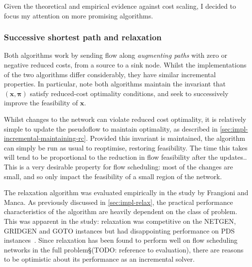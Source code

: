 Given the theoretical and empirical evidence against cost scaling, I decided to focus my attention on more promising algorithms.

\subsubsection{Successive shortest path and relaxation}

Both algorithms work by sending flow along \emph{augmenting paths} with zero or negative reduced costs, from a source to a sink node. Whilst the implementations of the two algorithms differ considerably, they have similar incremental properties. In particular, note both algorithms maintain the invariant that $\left(\mathbf{x},\boldsymbol{\pi}\right)$ satisfy reduced-cost optimality conditions, and seek to successively improve the feasibility of $\mathbf{x}$\footnotemark.

Whilst changes to the network can violate reduced cost optimality, it is relatively simple to update the pseudoflow to maintain optimality, as described in \cref{sec:impl-incremental-maintaining-rc}. Provided this invariant is maintained, the algorithm can simply be run as usual to reoptimise, restoring feasibility. The time this takes will tend to be proportional to the reduction in flow feasibility after the updates.\footnotemark. This is a very desirable property for flow scheduling: most of the changes are small, and so only impact the feasibility of a small region of the network.

The relaxation algorithm was evaluated empirically in the study by Frangioni and Manca. As previously discussed in \cref{sec:impl-relax}, the practical performance characteristics of the algorithm are heavily dependent on the class of problem. This was apparent in the study: relaxation was competitive on the NETGEN, GRIDGEN and GOTO instances but had disappointing performance on PDS instances~\cite[tables~1~to~4]{Frangioni:2006}. Since relaxation has been found to perform well on flow scheduling networks in the full problem\S(TODO: reference to evaluation), there are reasons to be optimistic about its performance as an incremental solver.

